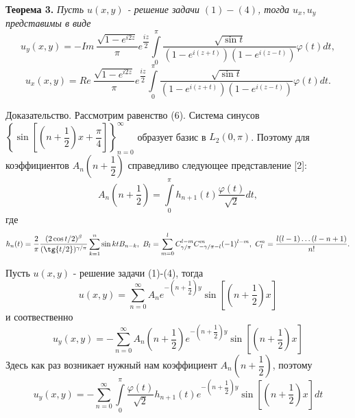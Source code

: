 \documentclass[a4paper, 9pt]{article}
\begin{document}
		\textbf{Теорема 3.} \textit{Пусть $u(x,y)$ - решение задачи $(1)-(4)$, тогда $u_x, u_y$ представимы в виде}
		\begin{equation}
			u_y(x,y) = - Im\  \dfrac{ \sqrt{1 - e^{i2z}} }{\pi} e^{\dfrac{iz}{2}} \int\limits_0^\pi  \dfrac{\sqrt{\sin{t}}}{\left(1 - e^{i(z+t)} \right) \left(1 - e^{i(z-t)}\right)}  \varphi(t) dt, 
		\end{equation}
		\begin{equation}
			u_x(x,y) = Re\   \dfrac{ \sqrt{1 - e^{i2z}} }{\pi} e^{\dfrac{iz}{2}} \int\limits_0^\pi  \dfrac{\sqrt{\sin{t}}}{\left(1 - e^{i(z+t)} \right) \left(1 - e^{i(z-t)}\right)}  \varphi(t) dt.
		\end{equation}
		\par
		Доказательство. Рассмотрим равенство (6). Система синусов $\left\{\sin{\left[\left(n +\dfrac12\right)x + \dfrac\pi4\right]}\right\}_{n=0}^{\infty}$ образует базис в $L_2(0,\pi)$. Поэтому для коэффициентов $A_n\left(n+\dfrac12\right)$ справедливо следующее представление [2]:
		\begin{equation*}
			A_n\left(n+\dfrac12\right) = \int\limits_0^\pi h_{n+1}(t) \dfrac{\varphi(t)}{\sqrt2} dt, 
		\end{equation*}
		где
		\begin{equation*}
			h_n(t) = \dfrac{2}{\pi}\dfrac{(2\cos{t/2})^\beta}{(\tg{t/2})^{\gamma/\pi}} \sum\limits_{k=1}^n \sin{kt} B_{n-k}, \ B_{l} = \sum\limits_{m=0}^{l} C_{\gamma/\pi}^{l-m} C_{-\gamma / \pi -l}^{m} (-1)^{l-m}, \ C_l^n = \dfrac{l(l-1)\dots (l-n+1)}{n!}. 
		\end{equation*}
		\par
		Пусть $u(x,y)$ - решение задачи (1)-(4), тогда
		\begin{equation*}
			u(x,y) = \sum\limits_{n=0}^{\infty} A_n e^{-\left(n + \dfrac12\right)y} \sin{\left[\left(n + \dfrac12\right)x\right]}
		\end{equation*}
		и соотвественно
		\begin{equation*}
			u_y(x,y) = -\sum\limits_{n=0}^{\infty} A_n \left(n +\dfrac12\right) e^{-\left(n + \dfrac12\right)y} \sin{\left[\left(n + \dfrac12\right)x\right]}
		\end{equation*}
		Здесь как раз возникает нужный нам коэффициент $A_n \left(n+\dfrac12\right)$, поэтому
		\begin{equation*}
			u_y(x,y)  = - \sum\limits_{n=0}^{\infty}  \int\limits_0^\pi \dfrac{\varphi(t)}{\sqrt2}  h_{n+1}(t)  e^{-\left(n + \dfrac12\right)y} \sin{\left[\left(n + \dfrac12\right)x\right]} dt
		\end{equation*}
\end{document}
